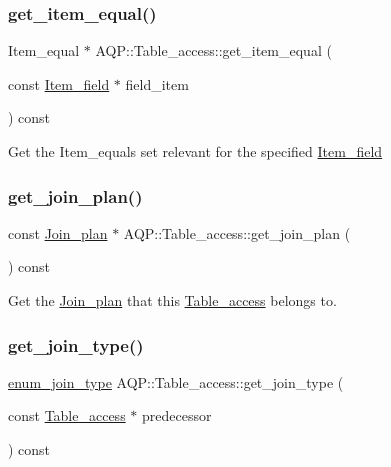 \subsubsection{\texorpdfstring{get\+\_\+item\+\_\+equal()}{get\_item\_equal()}}
{\footnotesize\ttfamily Item\+\_\+equal $\ast$ A\+Q\+P\+::\+Table\+\_\+access\+::get\+\_\+item\+\_\+equal (\begin{DoxyParamCaption}\item[{const \mbox{\hyperlink{classItem__field}{Item\+\_\+field}} $\ast$}]{field\+\_\+item }\end{DoxyParamCaption}) const}

Get the Item\+\_\+equal\textquotesingle{}s set relevant for the specified \textquotesingle{}\mbox{\hyperlink{classItem__field}{Item\+\_\+field}}\textquotesingle{} \mbox{\label{classAQP_1_1Table__access_a3e8216cc34a55ab3b132e36a4809fd37}} 
\subsubsection{\texorpdfstring{get\+\_\+join\+\_\+plan()}{get\_join\_plan()}}
{\footnotesize\ttfamily const \mbox{\hyperlink{classAQP_1_1Join__plan}{Join\+\_\+plan}} $\ast$ A\+Q\+P\+::\+Table\+\_\+access\+::get\+\_\+join\+\_\+plan (\begin{DoxyParamCaption}{ }\end{DoxyParamCaption}) const\hspace{0.3cm}{\ttfamily [inline]}}

Get the \mbox{\hyperlink{classAQP_1_1Join__plan}{Join\+\_\+plan}} that this \mbox{\hyperlink{classAQP_1_1Table__access}{Table\+\_\+access}} belongs to. \mbox{\label{classAQP_1_1Table__access_ade9e74888c7a810648a7802234aaf150}} 
\subsubsection{\texorpdfstring{get\+\_\+join\+\_\+type()}{get\_join\_type()}}
{\footnotesize\ttfamily \mbox{\hyperlink{namespaceAQP_a79358adf81977651643ef6c1672e18f8}{enum\+\_\+join\+\_\+type}} A\+Q\+P\+::\+Table\+\_\+access\+::get\+\_\+join\+\_\+type (\begin{DoxyParamCaption}\item[{const \mbox{\hyperlink{classAQP_1_1Table__access}{Table\+\_\+access}} $\ast$}]{predecessor }\end{DoxyParamCaption}) const}

